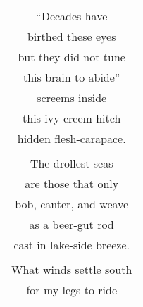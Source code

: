 \documentclass{article}
\begin{document}
\begin{center}
\textbf{} \\
\vspace*{2ex}
\begin{tabular}{c}
``Decades have \\
birthed these eyes \\
but they did not tune \\
this brain to abide'' \\
\hspace*{1ex}screems inside \\
this ivy-creem hitch \\
\hspace*{1ex} hidden flesh-carapace. \\
\\
The drollest seas \\
are those that only \\
bob, canter, and weave \\
as a beer-gut rod \\ %
cast in lake-side breeze. \\
\\
What winds settle south \\
for my legs to ride \\
\end{tabular}
\end{center}
\end{document}
